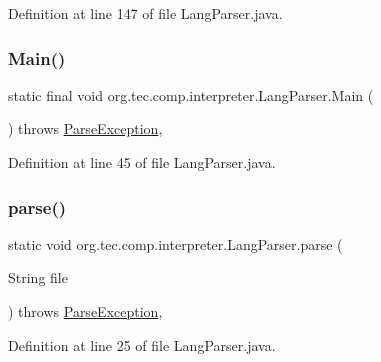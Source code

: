 Definition at line 147 of file Lang\+Parser.\+java.

\mbox{\label{classorg_1_1tec_1_1comp_1_1interpreter_1_1_lang_parser_abeb1d03b1bf2be12cbfaa977f9596d83}} 
\subsubsection{\texorpdfstring{Main()}{Main()}}
{\footnotesize\ttfamily static final void org.\+tec.\+comp.\+interpreter.\+Lang\+Parser.\+Main (\begin{DoxyParamCaption}{ }\end{DoxyParamCaption}) throws \mbox{\hyperlink{classorg_1_1tec_1_1comp_1_1interpreter_1_1_parse_exception}{Parse\+Exception}}\hspace{0.3cm}{\ttfamily [inline]}, {\ttfamily [static]}}



Definition at line 45 of file Lang\+Parser.\+java.

\mbox{\label{classorg_1_1tec_1_1comp_1_1interpreter_1_1_lang_parser_a26861644cef326306fff5a5f0d5b340c}} 
\subsubsection{\texorpdfstring{parse()}{parse()}}
{\footnotesize\ttfamily static void org.\+tec.\+comp.\+interpreter.\+Lang\+Parser.\+parse (\begin{DoxyParamCaption}\item[{String}]{file }\end{DoxyParamCaption}) throws \mbox{\hyperlink{classorg_1_1tec_1_1comp_1_1interpreter_1_1_parse_exception}{Parse\+Exception}}\hspace{0.3cm}{\ttfamily [inline]}, {\ttfamily [static]}}



Definition at line 25 of file Lang\+Parser.\+java.

